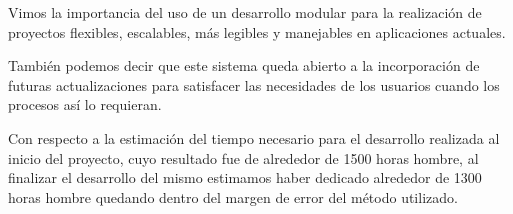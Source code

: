 Vimos la importancia del uso de un desarrollo modular para la realización de proyectos flexibles, escalables, más legibles y manejables en aplicaciones actuales.

También podemos decir que este sistema queda abierto a la incorporación de futuras actualizaciones para satisfacer las necesidades de los usuarios cuando los procesos así lo requieran.

Con respecto a la estimación del tiempo necesario para el desarrollo realizada al inicio del proyecto, cuyo resultado fue de alrededor de 1500 horas hombre, al finalizar el desarrollo del mismo estimamos haber dedicado alrededor de 1300 horas hombre quedando dentro del margen de error del método utilizado.

\label{chap:conclusiones}
